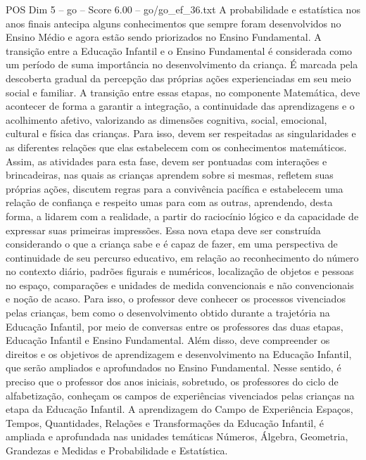 \begin{textsample}{POS Dim 5 – go – Score 6.00 – go/go\_ef\_36.txt}
A probabilidade e estatística nos anos finais antecipa alguns conhecimentos que sempre foram desenvolvidos no Ensino Médio e agora estão sendo priorizados no Ensino Fundamental.
A transição entre a Educação Infantil e o Ensino Fundamental é considerada como um período de suma importância no desenvolvimento da criança.
É marcada pela descoberta gradual da percepção das próprias ações experienciadas em seu meio social e familiar.
A transição entre essas etapas, no componente Matemática, deve acontecer de forma a garantir a integração, a continuidade das aprendizagens e o acolhimento afetivo, valorizando as dimensões cognitiva, social, emocional, cultural e física das crianças.
Para isso, devem ser respeitadas as singularidades e as diferentes relações que elas estabelecem com os conhecimentos matemáticos.
Assim, as atividades para esta fase, devem ser pontuadas com interações e brincadeiras, nas quais as crianças aprendem sobre si mesmas, refletem suas próprias ações, discutem regras para a convivência pacífica e estabelecem uma relação de confiança e respeito umas para com as outras, aprendendo, desta forma, a lidarem com a realidade, a partir do raciocínio lógico e da capacidade de expressar suas primeiras impressões.
Essa nova etapa deve ser construída considerando o que a criança sabe e é capaz de fazer, em uma perspectiva de continuidade de seu percurso educativo, em relação ao reconhecimento do número no contexto diário, padrões figurais e numéricos, localização de objetos e pessoas no espaço, comparações e unidades de medida convencionais e não convencionais e noção de acaso.
Para isso, o professor deve conhecer os processos vivenciados pelas crianças, bem como o desenvolvimento obtido durante a trajetória na Educação Infantil, por meio de conversas entre os professores das duas etapas, Educação Infantil e Ensino Fundamental.
Além disso, deve compreender os direitos e os objetivos de aprendizagem e desenvolvimento na Educação Infantil, que serão ampliados e aprofundados no Ensino Fundamental.
Nesse sentido, é preciso que o professor dos anos iniciais, sobretudo, os professores do ciclo de alfabetização, conheçam os campos de experiências vivenciados pelas crianças na etapa da Educação Infantil.
A aprendizagem do Campo de Experiência Espaços, Tempos, Quantidades, Relações e Transformações da Educação Infantil, é ampliada e aprofundada nas unidades temáticas Números, Álgebra, Geometria, Grandezas e Medidas e Probabilidade e Estatística.

\end{textsample}
